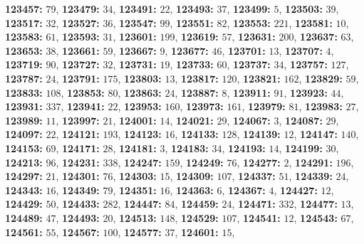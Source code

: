 \textsf{\bfseries 123457:} $79$, \textsf{\bfseries 123479:} $34$, \textsf{\bfseries 123491:} $22$, \textsf{\bfseries 123493:} $37$, \textsf{\bfseries 123499:} $5$, \textsf{\bfseries 123503:} $39$, \textsf{\bfseries 123517:} $32$, \textsf{\bfseries 123527:} $36$, \textsf{\bfseries 123547:} $99$, \textsf{\bfseries 123551:} $82$, \textsf{\bfseries 123553:} $221$, \textsf{\bfseries 123581:} $10$, \textsf{\bfseries 123583:} $61$, \textsf{\bfseries 123593:} $31$, \textsf{\bfseries 123601:} $199$, \textsf{\bfseries 123619:} $57$, \textsf{\bfseries 123631:} $200$, \textsf{\bfseries 123637:} $63$, \textsf{\bfseries 123653:} $38$, \textsf{\bfseries 123661:} $59$, \textsf{\bfseries 123667:} $9$, \textsf{\bfseries 123677:} $46$, \textsf{\bfseries 123701:} $13$, \textsf{\bfseries 123707:} $4$, \textsf{\bfseries 123719:} $90$, \textsf{\bfseries 123727:} $32$, \textsf{\bfseries 123731:} $19$, \textsf{\bfseries 123733:} $60$, \textsf{\bfseries 123737:} $34$, \textsf{\bfseries 123757:} $127$, \textsf{\bfseries 123787:} $24$, \textsf{\bfseries 123791:} $175$, \textsf{\bfseries 123803:} $13$, \textsf{\bfseries 123817:} $120$, \textsf{\bfseries 123821:} $162$, \textsf{\bfseries 123829:} $59$, \textsf{\bfseries 123833:} $108$, \textsf{\bfseries 123853:} $80$, \textsf{\bfseries 123863:} $24$, \textsf{\bfseries 123887:} $8$, \textsf{\bfseries 123911:} $91$, \textsf{\bfseries 123923:} $44$, \textsf{\bfseries 123931:} $337$, \textsf{\bfseries 123941:} $22$, \textsf{\bfseries 123953:} $160$, \textsf{\bfseries 123973:} $161$, \textsf{\bfseries 123979:} $81$, \textsf{\bfseries 123983:} $27$, \textsf{\bfseries 123989:} $11$, \textsf{\bfseries 123997:} $21$, \textsf{\bfseries 124001:} $14$, \textsf{\bfseries 124021:} $29$, \textsf{\bfseries 124067:} $3$, \textsf{\bfseries 124087:} $29$, \textsf{\bfseries 124097:} $22$, \textsf{\bfseries 124121:} $193$, \textsf{\bfseries 124123:} $16$, \textsf{\bfseries 124133:} $128$, \textsf{\bfseries 124139:} $12$, \textsf{\bfseries 124147:} $140$, \textsf{\bfseries 124153:} $69$, \textsf{\bfseries 124171:} $28$, \textsf{\bfseries 124181:} $3$, \textsf{\bfseries 124183:} $34$, \textsf{\bfseries 124193:} $14$, \textsf{\bfseries 124199:} $30$, \textsf{\bfseries 124213:} $96$, \textsf{\bfseries 124231:} $338$, \textsf{\bfseries 124247:} $159$, \textsf{\bfseries 124249:} $76$, \textsf{\bfseries 124277:} $2$, \textsf{\bfseries 124291:} $196$, \textsf{\bfseries 124297:} $21$, \textsf{\bfseries 124301:} $76$, \textsf{\bfseries 124303:} $15$, \textsf{\bfseries 124309:} $107$, \textsf{\bfseries 124337:} $51$, \textsf{\bfseries 124339:} $24$, \textsf{\bfseries 124343:} $16$, \textsf{\bfseries 124349:} $79$, \textsf{\bfseries 124351:} $16$, \textsf{\bfseries 124363:} $6$, \textsf{\bfseries 124367:} $4$, \textsf{\bfseries 124427:} $12$, \textsf{\bfseries 124429:} $50$, \textsf{\bfseries 124433:} $282$, \textsf{\bfseries 124447:} $84$, \textsf{\bfseries 124459:} $24$, \textsf{\bfseries 124471:} $332$, \textsf{\bfseries 124477:} $13$, \textsf{\bfseries 124489:} $47$, \textsf{\bfseries 124493:} $20$, \textsf{\bfseries 124513:} $148$, \textsf{\bfseries 124529:} $107$, \textsf{\bfseries 124541:} $12$, \textsf{\bfseries 124543:} $67$, \textsf{\bfseries 124561:} $55$, \textsf{\bfseries 124567:} $100$, \textsf{\bfseries 124577:} $37$, \textsf{\bfseries 124601:} $15$, 
